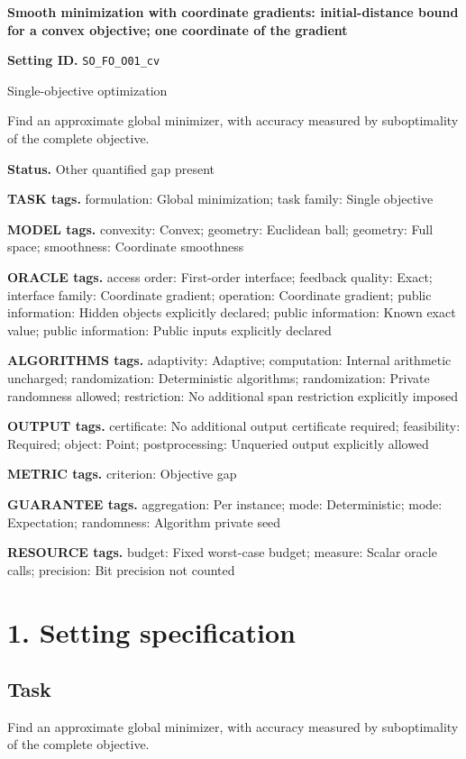 \documentclass[10pt,a4paper]{article}
\begin{document}
\raggedright

{\LARGE\bfseries\sffamily\color{AtlasNavy} Smooth minimization with coordinate gradients: initial-distance bound for a convex objective; one coordinate of the gradient\par}\vspace{5pt}
\textbf{Setting ID.} \texttt{SO\_\allowbreak{}\allowbreak{}FO\_\allowbreak{}\allowbreak{}O01\_\allowbreak{}\allowbreak{}cv}

Single-objective optimization

Find an approximate global minimizer, with accuracy measured by suboptimality of the complete objective.

\textbf{Status.} Other quantified gap present

\textbf{TASK tags.} formulation: Global minimization; task family: Single objective

\textbf{MODEL tags.} convexity: Convex; geometry: Euclidean ball; geometry: Full space; smoothness: Coordinate smoothness

\textbf{ORACLE tags.} access order: First-order interface; feedback quality: Exact; interface family: Coordinate gradient; operation: Coordinate gradient; public information: Hidden objects explicitly declared; public information: Known exact value; public information: Public inputs explicitly declared

\textbf{ALGORITHMS tags.} adaptivity: Adaptive; computation: Internal arithmetic uncharged; randomization: Deterministic algorithms; randomization: Private randomness allowed; restriction: No additional span restriction explicitly imposed

\textbf{OUTPUT tags.} certificate: No additional output certificate required; feasibility: Required; object: Point; postprocessing: Unqueried output explicitly allowed

\textbf{METRIC tags.} criterion: Objective gap

\textbf{GUARANTEE tags.} aggregation: Per instance; mode: Deterministic; mode: Expectation; randomness: Algorithm private seed

\textbf{RESOURCE tags.} budget: Fixed worst-case budget; measure: Scalar oracle calls; precision: Bit precision not counted

\section{1. Setting specification}
\subsection{Task}
Find an approximate global minimizer, with accuracy measured by suboptimality of the complete objective.
\end{document}
